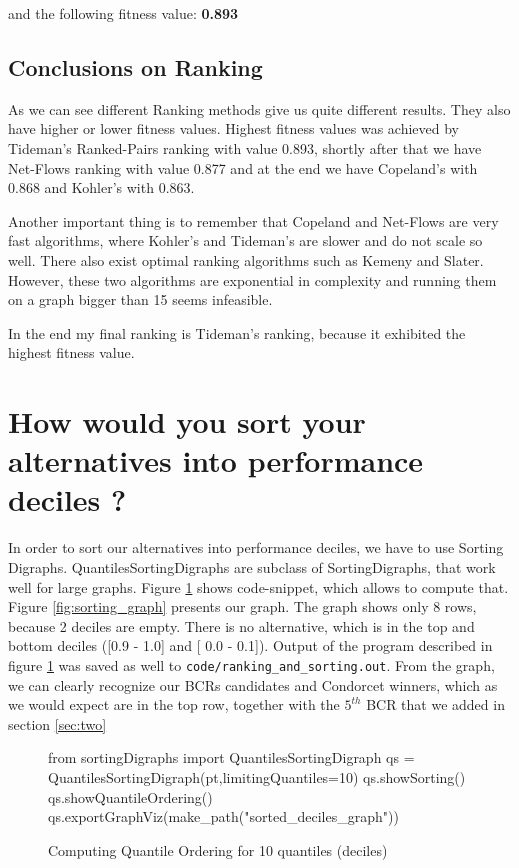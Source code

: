 \documentclass[a4paper]{article}
\begin{document}
and the following fitness value: \textbf{0.893}

\subsection{Conclusions on Ranking}

As we can see different Ranking methods give us quite different results. They also have higher or lower fitness values. Highest fitness values was achieved by Tideman's Ranked-Pairs ranking with value 0.893, shortly after that we have Net-Flows ranking with value 0.877 and at the end we have Copeland's with 0.868 and Kohler's with 0.863.

Another important thing is to remember that Copeland and Net-Flows are very fast algorithms, where Kohler's and Tideman's are slower and do not scale so well. There also exist optimal ranking algorithms such as Kemeny and Slater. However, these two algorithms are exponential in complexity and running them on a graph bigger than 15 seems infeasible.

In the end my final ranking is Tideman's ranking, because it exhibited the highest fitness value.

\section{How would you sort your alternatives into performance deciles ? }

In order to sort our alternatives into performance deciles, we have to use Sorting Digraphs. QuantilesSortingDigraphs are subclass of SortingDigraphs, that work well for large graphs. Figure \ref{lst:sorting} shows code-snippet, which allows to compute that. Figure \ref{fig:sorting_graph} presents our graph. The graph shows only 8 rows, because 2 deciles are empty. There is no alternative, which is in the top and bottom deciles ([0.9 - 1.0] and [ 0.0 - 0.1]). Output of the program described in figure \ref{lst:sorting} was saved as well to \texttt{code/ranking\_and\_sorting.out}. From the graph, we can clearly recognize our BCRs candidates and Condorcet winners, which as we would expect are in the top row, together with the $5^{th}$ BCR that we added in section \ref{sec:two}

\begin{figure}[H]
	\begin{center}
		\begin{python}
from sortingDigraphs import QuantilesSortingDigraph
qs = QuantilesSortingDigraph(pt,limitingQuantiles=10)
qs.showSorting()
qs.showQuantileOrdering()
qs.exportGraphViz(make_path("sorted_deciles_graph"))
		\end{python}
	\end{center}
	\caption{Computing Quantile Ordering for 10 quantiles (deciles)}
	\label{lst:sorting}
\end{figure}
\end{document}
